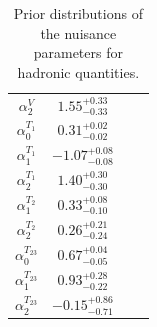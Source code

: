 \documentclass[twocolumn,epjc3]{svjour3}
\numberwithin{equation}{section}
\newcommand{\checked}[1]{{\color{brown}{ {\bf Checked: }{#1}}}}
\renewcommand{\checked}[1]{#1}
\renewcommand{\[}{\big[}
\renewcommand{\]}{\big]}
\renewcommand{\(}{\big(}
\renewcommand{\)}{\big)}
\begin{document}
\begin{table}
\begin{center}
\begin{tabular}{cccc}
$\alpha_{2}^{V}$       & $1.55^{+0.33}_{-0.33}$      & \cite{Straub:2015ica, Horgan:2015vla}\\
$\alpha_{0}^{T_1}$     & $0.31^{+0.02}_{-0.02}$      & \cite{Straub:2015ica, Horgan:2015vla}\\
$\alpha_{1}^{T_1}$     & $-1.07^{+0.08}_{-0.08}$     & \cite{Straub:2015ica, Horgan:2015vla}\\
$\alpha_{2}^{T_1}$     & $1.40^{+0.30}_{-0.30}$      & \cite{Straub:2015ica, Horgan:2015vla}\\
$\alpha_{1}^{T_2}$     & $0.33^{+0.08}_{-0.10}$     & \cite{Straub:2015ica, Horgan:2015vla}\\
$\alpha_{2}^{T_2}$     & $0.26^{+0.21}_{-0.24}$      & \cite{Straub:2015ica, Horgan:2015vla}\\
$\alpha_{0}^{T_{23}}$  & $0.67^{+0.04}_{-0.05}$      & \cite{Straub:2015ica, Horgan:2015vla}\\
$\alpha_{1}^{T_{23}}$  & $0.93^{+0.28}_{-0.22}$     & \cite{Straub:2015ica, Horgan:2015vla}\\
$\alpha_{2}^{T_{23}}$  & $-0.15^{+0.86}_{-0.71}$      & \cite{Straub:2015ica, Horgan:2015vla}\\
\hline
\end{tabular}
\renewcommand{\arraystretch}{1.0}
\caption{\label{tab:hadronic:nuisance} Prior distributions of the nuisance
  parameters for hadronic quantities. \checked{} }
\end{center}
\end{table}
\end{document}
